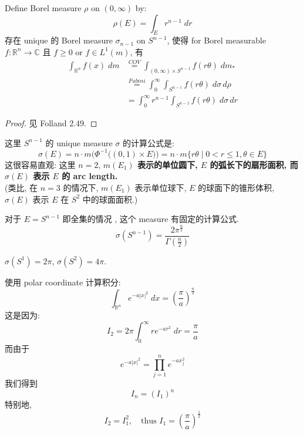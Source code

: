 \documentclass[lang=cn,11pt]{elegantbook}
\begin{document}
\begin{theorem}
Define Borel measure $\rho$ on $(0,\infty)$ by: \[
\rho(E) = \int_E r^{n-1} \; dr
\]
存在 unique 的 Borel measure $\sigma_{n-1}$ on $S^{n-1}$, 使得 for Borel measurable $f:\mathbb{R}^n \to \mathbb{C}$ 且 $f\geq 0$ or $f\in L^1(m)$, 有 \begin{align}
    \int_{\mathbb{R}^n} f(x) \; dm &\overset{COV}{=} \int_{(0,\infty)\times S^{n-1}} f(r\theta) \; dm_*\\
    &\overset{Fubini}{=}\int_0^{\infty}  \int_{S^{n-1}} f(r\theta) \; d\sigma \, d\rho\\
    &= \int_0^{\infty}  r^{n-1} \int_{S^{n-1}} f(r\theta) \; d\sigma \, dr
\end{align}
\end{theorem}
\begin{proof}
    见 Folland 2.49.
\end{proof}

\begin{remark}

这里 $S^{n-1}$ 的 unique measure $\sigma$ 的计算公式是: \[
\sigma(E) = n\cdot m\bigg(\Phi^{-1}\big( (0,1)\times E  \big)\bigg) = n\cdot m\{r\theta \mid   0<r \leq 1, \theta \in E\}
\]
这很容易直观: 
这里 $n=2$, \textbf{$m(E_1)$ 表示的单位圆下, $E$ 的弧长下的扇形面积, 而 $\sigma(E)$ 表示 $E$ 的 arc length.}\\
(类比, 在 $n=3$ 的情况下, $m(E_1) $ 表示单位球下, $E$ 的球面下的锥形体积, $\sigma(E)$ 表示 $E$ 在 $S^2$ 中的球面面积.)
\end{remark}

\begin{remark}
    对于 $E = S^{n-1}$ 即全集的情况 , 这个 measure 有固定的计算公式. \[
    \sigma(S^{n-1}) = \frac{2\pi^{\frac{n}{2}}}{\Gamma(\frac{n}{2})}
    \]
\end{remark}
\begin{example}
    $\sigma(S^1) = 2\pi$, $\sigma(S^2) = 4\pi$.
\end{example}



\begin{example}
    使用 polar coordinate 计算积分: \[
    \int _{\mathbb{R}^n} e^{-a|x|^2} \; dx = (\frac{\pi}{a})^{\frac{n}{2}}
     \]
这是因为: \[
I_2 = 2\pi \int_0^\infty re^{-ar^2} \; dr = \frac{\pi}{a}
\]
而由于 \[
e^{-a|x|^2} = \prod_{j=1}^n e^{-ax_j^2}
\]
我们得到 \[
I_n  = (I_1)^n
\]
特别地, \[
I_2  = I_1^2, \quad \text{thus } I_1  = (\frac{\pi}{a})^{\frac{1}{2}}
\]
\end{example}
\end{document}
